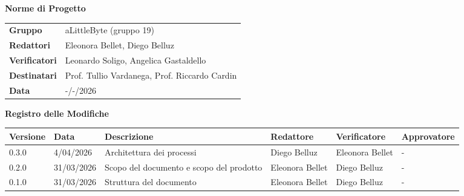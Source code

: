 \documentclass[a4paper,12pt]{article}
\begin{document}
\thispagestyle{firstpage}

\vspace*{0.5cm}

\begin{center}
    {\LARGE \textbf{Norme di Progetto}}
\end{center}

\vspace{1.5cm}

\begin{center}
    \renewcommand{\arraystretch}{1.3}
    \begin{tcolorbox}[
        width=0.92\textwidth,
        colback=gray!6,
        colframe=gray!45,
        boxrule=0.5pt,
        arc=2mm,
        boxsep=0pt,
        left=8pt, right=8pt, top=8pt, bottom=8pt
    ]
        \begin{tabularx}{\linewidth}{>{\bfseries}p{3.5cm} X}
            Gruppo      & aLittleByte (gruppo 19) \\
            Redattori   & Eleonora Bellet, Diego Belluz \\
            Verificatori& Leonardo Soligo, Angelica Gastaldello\\
            Destinatari & Prof. Tullio Vardanega, Prof. Riccardo Cardin \\
            Data        & -/-/2026 \\
        \end{tabularx}
    \end{tcolorbox}
\end{center}

\newpage


\begin{center}
    {\Large \textbf{Registro delle Modifiche}}
\end{center}

\vspace{0.35cm}

\renewcommand{\arraystretch}{1.35}
\begin{center}
    {\footnotesize
    \begin{tabularx}{\textwidth}{|p{1.4cm}|p{1.8cm}|X|p{2.4cm}|p{2.3cm}|p{2.3cm}|}
        \hline
        \rowcolor{gray!20}
        \textbf{Versione} & \textbf{Data} & \textbf{Descrizione} & \textbf{Redattore} & \textbf{Verificatore} & \textbf{Approvatore} \\
        \hline
        0.3.0 & 4/04/2026 & Architettura dei processi & Diego Belluz & Eleonora Bellet & - \\
        \hline
        0.2.0 & 31/03/2026 & Scopo del documento e scopo del prodotto & Eleonora Bellet & Diego Belluz & - \\
        \hline
        0.1.0 & 31/03/2026 & Struttura del documento & Eleonora Bellet & Diego Belluz & - \\
        \hline
        
    \end{tabularx}
    }
    
\end{center}
\newpage
\end{document}
